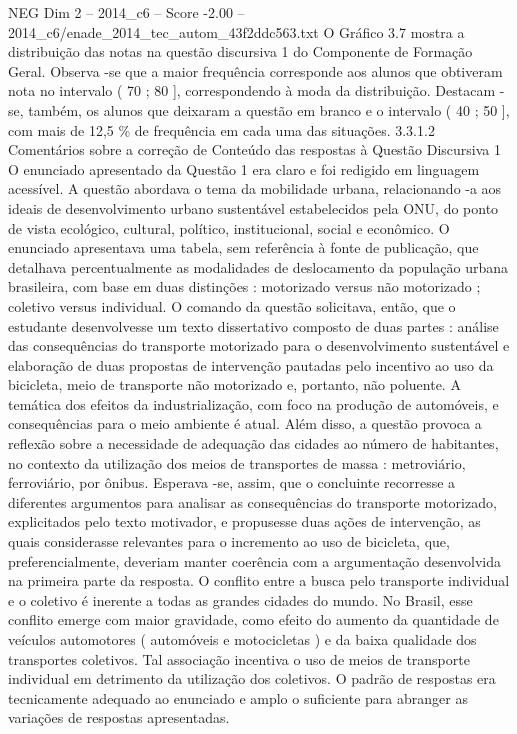 \begin{textsample}{NEG Dim 2 – 2014\_c6 – Score -2.00 – 2014\_c6/enade\_2014\_tec\_autom\_43f2ddc563.txt}
O Gráfico 3.7 mostra a distribuição das notas na questão discursiva 1 do Componente de Formação Geral.
Observa -se que a maior frequência corresponde aos alunos que obtiveram nota no intervalo ( 70 ; 80 ], correspondendo à moda da distribuição.
Destacam -se, também, os alunos que deixaram a questão em branco e o intervalo ( 40 ; 50 ], com mais de 12,5 \% de frequência em cada uma das situações. 3.3.1.2 Comentários sobre a correção de Conteúdo das respostas à Questão Discursiva 1 O enunciado apresentado da Questão 1 era claro e foi redigido em linguagem acessível.
A questão abordava o tema da mobilidade urbana, relacionando -a aos ideais de desenvolvimento urbano sustentável estabelecidos pela ONU, do ponto de vista ecológico, cultural, político, institucional, social e econômico.
O enunciado apresentava uma tabela, sem referência à fonte de publicação, que detalhava percentualmente as modalidades de deslocamento da população urbana brasileira, com base em duas distinções : motorizado versus não motorizado ; coletivo versus individual.
O comando da questão solicitava, então, que o estudante desenvolvesse um texto dissertativo composto de duas partes : análise das consequências do transporte motorizado para o desenvolvimento sustentável e elaboração de duas propostas de intervenção pautadas pelo incentivo ao uso da bicicleta, meio de transporte não motorizado e, portanto, não poluente.
A temática dos efeitos da industrialização, com foco na produção de automóveis, e consequências para o meio ambiente é atual.
Além disso, a questão provoca a reflexão sobre a necessidade de adequação das cidades ao número de habitantes, no contexto da utilização dos meios de transportes de massa : metroviário, ferroviário, por ônibus.
Esperava -se, assim, que o concluinte recorresse a diferentes argumentos para analisar as consequências do transporte motorizado, explicitados pelo texto motivador, e propusesse duas ações de intervenção, as quais considerasse relevantes para o incremento ao uso de bicicleta, que, preferencialmente, deveriam manter coerência com a argumentação desenvolvida na primeira parte da resposta.
O conflito entre a busca pelo transporte individual e o coletivo é inerente a todas as grandes cidades do mundo.
No Brasil, esse conflito emerge com maior gravidade, como efeito do aumento da quantidade de veículos automotores ( automóveis e motocicletas ) e da baixa qualidade dos transportes coletivos.
Tal associação incentiva o uso de meios de transporte individual em detrimento da utilização dos coletivos.
O padrão de respostas era tecnicamente adequado ao enunciado e amplo o suficiente para abranger as variações de respostas apresentadas.

\end{textsample}
